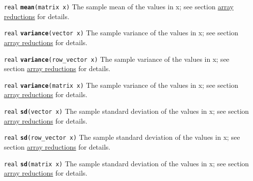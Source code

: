 \documentclass[
  10pt,
]{book}
\begin{document}

\texttt{real} \textbf{\texttt{mean}}\texttt{(matrix\ x)}\newline
The sample mean of the values in x; see section
\protect\hyperlink{array-reductions}{array reductions} for details.


\texttt{real} \textbf{\texttt{variance}}\texttt{(vector\ x)}\newline
The sample variance of the values in x; see section
\protect\hyperlink{array-reductions}{array reductions} for details.


\texttt{real} \textbf{\texttt{variance}}\texttt{(row\_vector\ x)}\newline
The sample variance of the values in x; see section
\protect\hyperlink{array-reductions}{array reductions} for details.


\texttt{real} \textbf{\texttt{variance}}\texttt{(matrix\ x)}\newline
The sample variance of the values in x; see section
\protect\hyperlink{array-reductions}{array reductions} for details.


\texttt{real} \textbf{\texttt{sd}}\texttt{(vector\ x)}\newline
The sample standard deviation of the values in x; see section
\protect\hyperlink{array-reductions}{array reductions} for details.


\texttt{real} \textbf{\texttt{sd}}\texttt{(row\_vector\ x)}\newline
The sample standard deviation of the values in x; see section
\protect\hyperlink{array-reductions}{array reductions} for details.


\texttt{real} \textbf{\texttt{sd}}\texttt{(matrix\ x)}\newline
The sample standard deviation of the values in x; see section
\protect\hyperlink{array-reductions}{array reductions} for details.
\end{document}
